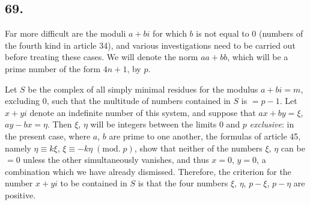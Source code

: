 \documentclass[twoside,12pt]{memoir}
\renewcommand{\pmod}[1]{\;(\textrm{mod.}\;#1)}
\begin{document}
\subsection*{69.}

Far more difficult are the moduli \(a+b i\) for which \(b\) is not equal to \(0\) (numbers of the fourth kind in article 34), and various investigations need to be carried out before treating these cases. We will denote the norm \(a a+b b\), which will be a prime number of the form \(4n+1\), by \(p\).

Let \(S\) be the complex of all simply minimal residues for the modulus \(a+bi=m\), excluding \(0\), such that the multitude of numbers contained in \(S\) is \(=p-1\). Let \(x+yi\) denote an indefinite number of this system, and suppose that \(ax+by=\xi\), \(ay-bx=\eta\). Then \(\xi\), \(\eta\) will be integers  between the limits \(0\) and \(p\) \textit{exclusive}: in the present case, where \(a\), \(b\) are prime to one another, the formulas of article 45, namely \(\eta \equiv k \xi\), \(\xi \equiv-k \eta\pmod{p}\), show that neither of the numbers \(\xi\), \(\eta\) can be \(=0\) unless the other simultaneously vanishes, and thus \(x=0\), \(y=0\), a combination which we have already dismissed. Therefore, the criterion for the number \(x+yi\) to be contained in \(S\) is that the four numbers \(\xi\), \(\eta\), \(p-\xi\), \(p-\eta\) are positive.
\end{document}
